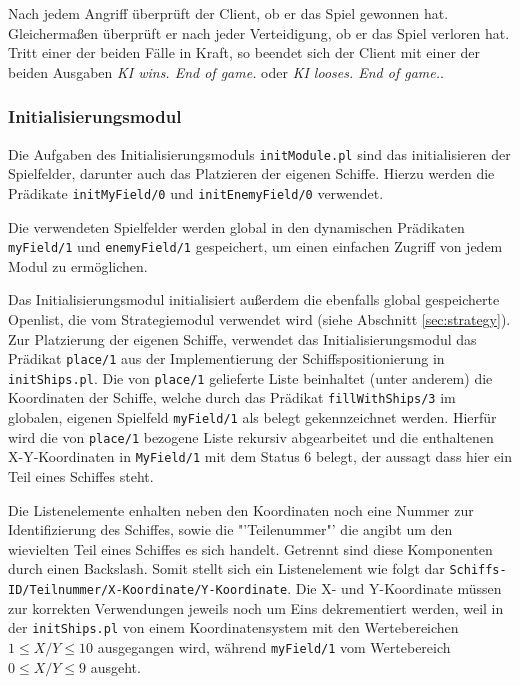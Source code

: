 	Nach jedem Angriff überprüft der Client, ob er das Spiel gewonnen hat. Gleichermaßen überprüft er nach jeder Verteidigung, 
	ob er das Spiel verloren hat. Tritt einer der beiden Fälle in Kraft, so beendet sich der Client mit einer der beiden Ausgaben
	\textit{KI wins. End of game.} oder \textit{KI looses. End of game.}.
	

\subsubsection{Initialisierungsmodul} \label{sec:initModule}
	Die Aufgaben des Initialisierungsmoduls \texttt{initModule.pl} sind das initialisieren der Spielfelder, darunter auch
	das Platzieren der eigenen Schiffe. Hierzu werden die Prädikate \texttt{initMyField/0} und \texttt{initEnemyField/0} verwendet.
	
	Die verwendeten Spielfelder werden global in den dynamischen Prädikaten \texttt{myField/1} und \texttt{enemyField/1}
	gespeichert, um einen einfachen Zugriff von jedem Modul zu ermöglichen. 
	
	Das Initialisierungsmodul initialisiert außerdem die ebenfalls global gespeicherte Openlist, 
	die vom Strategiemodul verwendet wird (siehe Abschnitt \ref{sec:strategy}). 
	Zur Platzierung der eigenen Schiffe, verwendet das Initialisierungsmodul das Prädikat \texttt{place/1} aus der Implementierung 
	der Schiffspositionierung in \texttt{initShips.pl}.
	Die von \texttt{place/1} gelieferte Liste beinhaltet (unter anderem) die Koordinaten der Schiffe, welche durch das Prädikat 
	\texttt{fillWithShips/3} im globalen, eigenen Spielfeld \texttt{myField/1} als belegt gekennzeichnet werden. Hierfür wird 
	die von \texttt{place/1} bezogene Liste rekursiv abgearbeitet und die enthaltenen X-Y-Koordinaten in \texttt{MyField/1} mit dem 
	Status 6 belegt, der aussagt dass hier ein Teil eines Schiffes steht.
	
	Die Listenelemente enhalten neben den Koordinaten noch eine Nummer zur Identifizierung des Schiffes, sowie die "'Teilenummer"' 
	die angibt um den wievielten Teil eines Schiffes es sich handelt. Getrennt sind diese Komponenten durch einen Backslash. Somit 
	stellt sich ein Listenelement wie folgt dar \texttt{Schiffs-ID/Teilnummer/X-Koordinate/Y-Koordinate}.
	Die X- und Y-Koordinate müssen zur korrekten Verwendungen jeweils noch um Eins dekrementiert werden, weil in der \texttt{initShips.pl} von 
	einem Koordinatensystem mit den Wertebereichen $1\le X/Y\le 10$ ausgegangen wird, während \texttt{myField/1} vom Wertebereich $0\le X/Y\le 9$ ausgeht.


